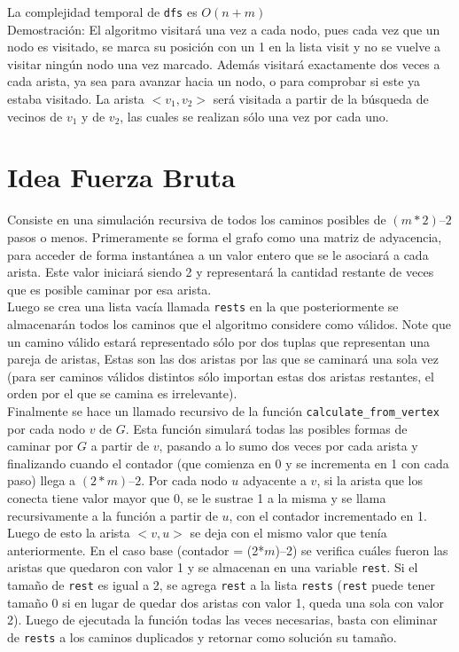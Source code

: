 \documentclass[a4paper,12pt,twocolumn]{article}
\begin{document}
 La complejidad temporal de \texttt{\ttfamily dfs} es $O(n + m)$\\
 Demostración:	 El algoritmo visitará una vez a cada nodo, pues cada vez que un nodo es visitado, se marca su posición con un 1 en la lista visit y no se vuelve a visitar ningún nodo una vez marcado. Además visitará exactamente dos veces a cada arista, ya sea para avanzar hacia un nodo, o para comprobar si este ya estaba visitado. La arista $<v_1, v_2>$ será visitada a partir de la búsqueda de vecinos de $v_1$ y de $v_2$, las cuales se realizan sólo una vez por cada uno.\\
 
 
\section{Idea Fuerza Bruta}
	Consiste en una simulación recursiva de todos los caminos posibles de $(m*2)–2$ pasos o menos. Primeramente se forma el grafo como una matriz de adyacencia, para acceder de forma instantánea a un valor entero que se le asociará a cada arista. Este valor iniciará siendo 2 y representará la cantidad restante de veces que es posible caminar por esa arista. \\
	Luego se crea una lista vacía llamada \texttt{\ttfamily rests} en la que posteriormente se almacenarán todos los caminos que el algoritmo considere como válidos. Note que un camino válido estará representado sólo por dos tuplas que representan una pareja de aristas, Estas son las dos aristas por las que se caminará una sola vez (para ser caminos válidos distintos sólo importan estas dos aristas restantes, el orden por el que se camina es irrelevante).\\
	Finalmente se hace un llamado recursivo de la función \texttt{\ttfamily calculate\_from\_vertex} por cada nodo $v$ de $G$. Esta función simulará todas las posibles formas de caminar por $G$ a partir de $v$, pasando a lo sumo dos veces por cada arista y finalizando cuando el contador (que comienza en 0 y se incrementa en 1 con cada paso) llega a $(2*m)–2$. Por cada nodo $u$ adyacente a $v$, si la arista que los conecta tiene valor mayor que 0, se le sustrae 1 a la misma y se llama recursivamente a la función a partir de $u$, con el contador incrementado en 1. Luego de esto la arista $<v, u>$ se deja con el mismo valor que tenía anteriormente. En el caso base (contador = (2*$m$)–2) se verifica cuáles fueron las aristas que quedaron con valor 1 y se almacenan en una variable \texttt{\ttfamily rest}. Si el tamaño de \texttt{\ttfamily rest} es igual a 2, se agrega \texttt{\ttfamily rest} a la lista \texttt{\ttfamily rests} (\texttt{\ttfamily rest} puede tener tamaño 0 si en lugar de quedar dos aristas con valor 1, queda una sola con valor 2). Luego de ejecutada la función todas las veces necesarias, basta con eliminar de \texttt{\ttfamily rests} a los caminos duplicados y retornar como solución su tamaño.\\
\end{document}
